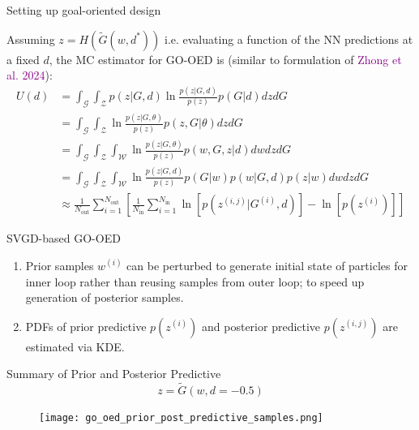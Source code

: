 \documentclass[usenames,dvipsnames,aspectratio=169]{beamer}
\theoremstyle{definition}
\begin{document}
    
\begin{frame}{Setting up goal-oriented design}

    Assuming $z=H(\tilde{G}(w, d^{\ast}))$ i.e. evaluating a function of the NN predictions at a fixed $d$, the MC estimator for GO-OED is (similar to formulation of \textcolor{purple}{Zhong et al. 2024}):
    \begin{align*}
        U(d) &= \int_{\mathcal{G}} \int_{\mathcal{Z}} p(z | G, d) \ln \frac{p(z | G, d)}{p(z)}p(G | d) dz dG \\ \nonumber
        &= \int_{\mathcal{G}} \int_{\mathcal{Z}} \ln \frac{p(z | G, \theta)}{p(z)}p(z, G | \theta) dz dG \nonumber\\
        &= \int_{\mathcal{G}} \int_{\mathcal{Z}} \int_{\mathcal{W}} \ln \frac{p(z | G, \theta)}{p(z)} p(w, G, z | d) dw dz dG \nonumber\\
        &=\int_{\mathcal{G}} \int_{\mathcal{Z}} \int_{\mathcal{W}} \ln \frac{p(z | G, d)}{p(z)} p(G | w) p(w | G, d)p(z | w) dw dz dG \nonumber \\
        &\approx \frac{1}{N_{\textrm{out}}} \sum_{i=1}^{N_{\textrm{out}}} \left[\frac{1}{N_{\textrm{in}}}\sum_{i=1}^{N_{\textrm{in}}} \ln \left[p(z^{(i, j)} | G^{(i)}, d)\right] - \ln\left[p(z^{(i)})\right]\right] \label{eq: estimator_eig_pred} \nonumber
    \end{align*}
\end{frame}

\begin{frame}{SVGD-based GO-OED}
    \begin{enumerate}
        \item Prior samples $w^{(i)}$ can be perturbed to generate initial state of particles for inner loop rather than reusing samples from outer loop; to speed up generation of posterior samples.
        
        \item PDFs of prior predictive $p(z^{(i)})$ and posterior predictive $p(z^{(i, j)})$ are estimated via KDE.
    \end{enumerate}
\end{frame}

\begin{frame}{Summary of Prior and Posterior Predictive}
$$z = \tilde{G}(w, d=-0.5)$$
\begin{figure}
    \centering
    \texttt{[image: go\_oed\_prior\_post\_predictive\_samples.png]}
\end{figure}
\end{frame}
\end{document}
